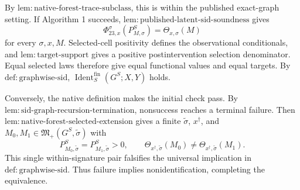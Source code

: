 By \(\mathrm{lem:native\text{-}forest\text{-}trace\text{-}subclass}\), this is within the published exact-graph setting. If Algorithm 1 succeeds, \(\mathrm{lem:published\text{-}latent\text{-}sid\text{-}soundness}\) gives
\[
 \Phi_{23,x}^{\sigma}(P_{M,\sigma}^S)=\Theta_{x,\sigma}(M)
\]
for every \(\sigma,x,M\). Selected-cell positivity defines the observational conditionals, and \(\mathrm{lem:target\text{-}support}\) gives a positive postintervention selection denominator. Equal selected laws therefore give equal functional values and equal targets. By \(\mathrm{def:graphwise\text{-}sid}\), \(\operatorname{Ident}^{\mathrm{fin}}_S(G^S;X,Y)\) holds.

Conversely, the native definition makes the initial check pass. By \(\mathrm{lem:sid\text{-}graph\text{-}recursion\text{-}termination}\), nonsuccess reaches a terminal failure. Then \(\mathrm{lem:native\text{-}forest\text{-}selected\text{-}extension}\) gives a finite \(\widetilde\sigma\), \(x^\dagger\), and \(M_0,M_1\in\mathfrak M_+(G^S,\widetilde\sigma)\) with
\[
 P_{M_0,\widetilde\sigma}^S=P_{M_1,\widetilde\sigma}^S>0,\qquad
 \Theta_{x^\dagger,\widetilde\sigma}(M_0)\ne
 \Theta_{x^\dagger,\widetilde\sigma}(M_1).
\]
This single within-signature pair falsifies the universal implication in \(\mathrm{def:graphwise\text{-}sid}\). Thus failure implies nonidentification, completing the equivalence.